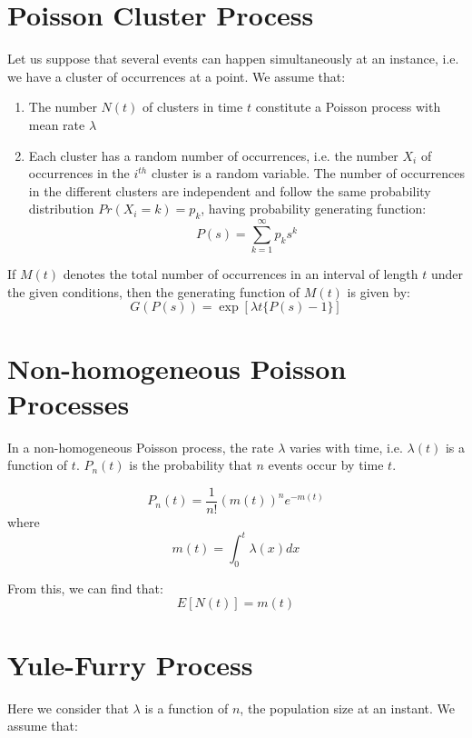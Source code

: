 \documentclass[12pt,letterpaper]{book}
\theoremstyle{definition}
\begin{document}
\section{Poisson Cluster Process}

Let us suppose that several events can happen simultaneously at an instance, i.e. we have a cluster of occurrences at a point. We assume that:
\begin{enumerate}
  \item The number $N(t)$ of clusters in time $t$ constitute a Poisson process with mean rate $\lambda$
  \item Each cluster has a random number of occurrences, i.e. the number $X_i$ of occurrences in the $i^{th}$ cluster is a random variable. The number of occurrences in the different clusters are independent and follow the same probability distribution $Pr(X_i = k) = p_k$, having probability generating function:
    \[P(s) = \sum_{k = 1}^{\infty} p_ks^k\]
\end{enumerate}

\begin{theorem}
  If $M(t)$ denotes the total number of occurrences in an interval of length $t$ under the given conditions, then the generating function of $M(t)$ is given by:
  \[G(P(s)) = \exp [\lambda t \{P(s)-1\}]\]
\end{theorem}

\section{Non-homogeneous Poisson Processes}

In a non-homogeneous Poisson process, the rate $\lambda$ varies with time, i.e. $\lambda(t)$ is a function of $t$. $P_n(t)$ is the probability that $n$ events occur by time $t$.

\begin{theorem}
  \[P_n(t) = \frac{1}{n!} (m(t))^n e^{-m(t)}\] 
  where
  \[m(t) = \int_0^t \lambda(x) dx\]
\end{theorem}

From this, we can find that:
\[E[N(t)] = m(t)\]

\section{Yule-Furry Process}

Here we consider that $\lambda$ is a function of $n$, the population size at an instant. We assume that:
\end{document}
